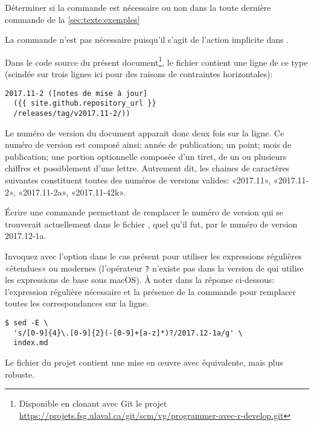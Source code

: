 \begin{exercice}
  Déterminer si la commande  est nécessaire ou non dans la
  toute dernière commande  de la
  \autoref{sec:texte:exemples}
  \begin{sol}
    La commande n'est pas nécessaire puisqu'il s'agit de l'action
    implicite dans .
  \end{sol}
\end{exercice}

\begin{exercice}
  Dans le code source du présent document\footnote{%
    Disponible en clonant avec Git le projet
    \url{https://projets.fsg.ulaval.ca/git/scm/vg/programmer-avec-r-develop.git}}, %
  le fichier  contient une ligne de ce type
  (scindée sur trois lignes ici pour des raisons de contraintes
  horizontales):
  \begin{Schunk}
\begin{Verbatim}
2017.11-2 ([notes de mise à jour]
  ({{ site.github.repository_url }}
  /releases/tag/v2017.11-2/))
\end{Verbatim}
  \end{Schunk}
  Le numéro de version du document apparait donc deux fois sur la
  ligne. Ce numéro de version est composé ainsi: année de publication;
  un point; mois de publication; une portion optionnelle composée d'un
  tiret, de un ou plusieurs chiffres et possiblement d'une lettre.
  Autrement dit, les chaines de caractères suivantes constituent
  toutes des numéros de versions valides: «2017.11», «2017.11-2»,
  «2017.11-2a», «2017.11-42k».

  Écrire une commande  permettant de remplacer le numéro de
  version qui se trouverait actuellement dans le fichier
  , quel qu'il fut, par le numéro de version
  2017.12-1a.
  \begin{sol}
    Invoquez  avec l'option  dans le cas présent
    pour utiliser les expressions régulières «étendues» ou modernes
    (l'opérateur \verb=?= n'existe pas dans la version de 
    qui utilise les expressions de base sous macOS). À noter dans la
    réponse ci-dessous: l'expression régulière nécessaire et la
    présence de la commande  pour remplacer toutes les
    correspondances sur la ligne.
    \begin{Schunk}
\begin{Verbatim}
$ sed -E \
  's/[0-9]{4}\.[0-9]{2}(-[0-9]+[a-z]*)?/2017.12-1a/g' \
  index.md
\end{Verbatim}
    \end{Schunk}
    Le fichier  du projet contient une mise en
    œuvre avec  équivalente, mais plus robuste.
  \end{sol}
\end{exercice}



